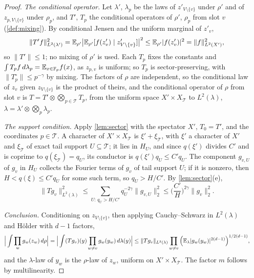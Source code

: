\begin{proof}
\emph{The conditional operator.} Let $\lambda'$, $\lambda_p$ be the laws of
$z'_{V\setminus\{v\}}$ under $\rho'$ and of $z_{p,V\setminus\{v\}}$ under $\rho_p$,
and $T'$, $T_p$ the conditional operators of $\rho'$, $\rho_p$ from slot $v$
(\cref{def:mixing}). By conditional Jensen and the uniform marginal of $z'_v$,
\begin{equation}\label{eq:pre:contraction}
 \|T'f\|_{L^2(\lambda')}^2=\mathbb E_{\rho'}\big|\mathbb E_{\rho'}[f(z'_v)\mid z'_{V\setminus\{v\}}]\big|^2
 \le\mathbb E_{\rho'}|f(z'_v)|^2=\|f\|_{L^2(X')}^2 ,
\end{equation}
so $\|T'\|\le1$; no mixing of $\rho'$ is used. Each $T_p$ fixes the constants and
$\int T_pf\,d\lambda_p=\mathbb E_{x\in\mathbb F_p}f(x)$, as $z_{p,v}$ is uniform; so $T_p$ is
sector-preserving, with $\|T_p^\circ\|\le p^{-\gamma}$ by mixing. The factors of
$\rho$ are independent, so the conditional law of $z_v$ given
$z_{V\setminus\{v\}}$ is the product of theirs, and the conditional operator of
$\rho$ from slot $v$ is $T=T'\otimes\bigotimes_{p\in\mathcal T}T_p$, from the
uniform space $X'\times X_{\mathcal T}$ to $L^2(\lambda)$,
$\lambda=\lambda'\otimes\bigotimes_p\lambda_p$.

\emph{The support condition.} Apply \cref{lem:sector} with the spectator $X'$,
$T_0=T'$, and the coordinates $p\in\mathcal T$. A character of
$X'\times X_{\mathcal T}$ is $\xi'+\xi_{\mathcal T}$, with $\xi'$ a character of
$X'$ and $\xi_{\mathcal T}$ of exact tail support $U\subseteq\mathcal T$; it lies in
$H_U$, and since $q(\xi')$ divides $C'$ and is coprime to
$q(\xi_{\mathcal T})=q_U$, its conductor is $q(\xi')q_U\le C'q_U$. The component
$g_{v,U}$ of $g_v$ in $H_U$ collects the Fourier terms of $g_v$ of tail support
$U$; if it is nonzero, then $H<q(\xi)\le C'q_U$ for some such term, so
$q_U>H/C'$. By \cref{lem:sector}(e),
\[
 \|Tg_v\|^2_{L^2(\lambda)}\le\sum_{U:\,q_U>H/C'}q_U^{-2\gamma}\|g_{v,U}\|_2^2
 \le\Big(\frac{C'}H\Big)^{2\gamma}\|g_v\|_2^2 .
\]

\emph{Conclusion.} Conditioning on $z_{V\setminus\{v\}}$, then applying
Cauchy--Schwarz in $L^2(\lambda)$ and H\"older with $d-1$ factors,
\[
 \Big|\int\prod_wg_w(z_w)\,d\rho\Big|=\Big|\int(Tg_v)(y)\prod_{w\ne v}g_w(y_w)\,d\lambda(y)\Big|
 \le\|Tg_v\|_{L^2(\lambda)}\prod_{w\ne v}\Big(\mathbb E_\lambda|g_w(y_w)|^{2(d-1)}\Big)^{1/2(d-1)} ,
\]
and the $\lambda$-law of $y_w$ is the $\rho$-law of $z_w$, uniform on
$X'\times X_{\mathcal T}$. The factor $m$ follows by multilinearity.
\end{proof}

